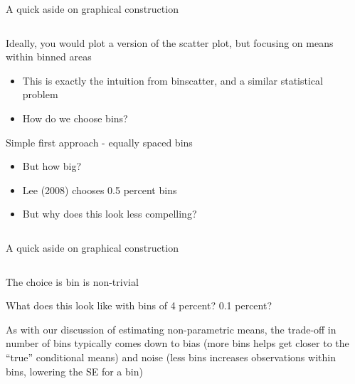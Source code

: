 \documentclass[notes,11pt, aspectratio=169]{beamer}
\newenvironment{wideitemize}{\itemize\addtolength{\itemsep}{10pt}}{\enditemize}
\begin{document}
\begin{frame}{A quick aside on graphical construction}
  \begin{columns}[onlytextwidth, T] %
    \begin{column}{.5\textwidth}
      \begin{wideitemize}
      \item Ideally, you would plot a version of the scatter plot, but
        focusing on means within binned areas
        \begin{itemize}
        \item This is exactly the intuition from binscatter, and a
          similar statistical problem
        \item How do we choose bins?
        \end{itemize}
      \item Simple first approach - equally spaced bins
        \begin{itemize}
        \item But how big?
        \item Lee (2008) chooses 0.5 percent bins
        \item But why does this look less compelling?
        \end{itemize}
      \end{wideitemize}
    \end{column}%
    \hfill%
    \begin{column}{.5\textwidth}
    \end{column}%
  \end{columns}
\end{frame}

\begin{frame}{A quick aside on graphical construction}
  \begin{columns}[onlytextwidth, T] %
    \begin{column}{.5\textwidth}
      \begin{wideitemize}
      \item The choice is bin is non-trivial
      \item What does this look like with bins of 4 percent? 0.1 percent?
      \item<3-> As with our discussion of estimating non-parametric
        means, the trade-off in number of bins typically comes down to
        bias (more bins helps get closer to the ``true'' conditional
        means) and noise (less bins increases observations within
        bins, lowering the SE for a bin)
      \end{wideitemize}
    \end{column}%
    \hfill%
    \begin{column}{.5\textwidth}
    \end{column}%
  \end{columns}
\end{frame}
\end{document}
